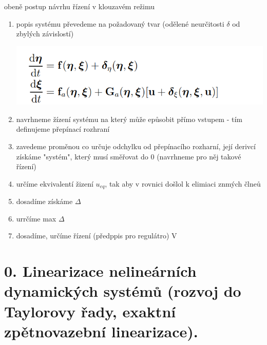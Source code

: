 obeně postup návrhu řízení v klouzavém režimu
\begin{enumerate}
    \item popis systému převedeme na požadovaný tvar (odělené neurčitosti $\delta $ od zbylých závislostí)
    
    \includegraphics[scale =0.4]{img/klouzavy_tavr.png}
    \item navrhneme žízení systému na který může epůsobit přímo vstupem - tím definujeme přepínací rozhraní
    \item zavedeme proměnou co určuje odchylku od přepínacího rozharní, její derivcí získáme "systém", který musí směřovat do 0 (navrhneme pro něj takové řízení)
    \item určíme ekvivalentí žizení $u_{eq}$, tak aby v rovnici došlol k elimiaci znmých člneů
    \item dosadíme získáme $\Delta$
    \item urrčíme max $\Delta$ 
    \item dosadíme, určíme řízení (předppis pro regulátro) V

\end{enumerate}

\section{0. Linearizace nelineárních dynamických systémů (rozvoj do Taylorovy řady, exaktní zpětnovazební
linearizace).
}